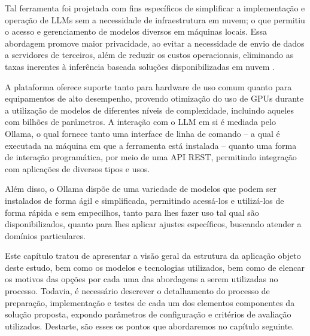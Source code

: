 Tal ferramenta foi projetada com fins específicos de simplificar a implementação e operação de \ac{LLM}s sem a necessidade de infraestrutura em nuvem; o que permitiu o acesso e gerenciamento de modelos diversos em máquinas locais. Essa abordagem promove maior privacidade, ao evitar a necessidade de envio de dados a servidores de terceiros, além de reduzir os custos operacionais, eliminando as taxas inerentes à inferência baseada soluções disponibilizadas em nuvem \cite{Ollama:1}.

A plataforma oferece suporte tanto para hardware de uso comum quanto para equipamentos de alto desempenho, provendo otimização do uso de GPUs durante a utilização de modelos de diferentes níveis de complexidade, incluindo aqueles com bilhões de parâmetros. A interação com o \ac{LLM} em si é mediada pelo Ollama, o qual fornece tanto uma interface de linha de comando -- a qual é executada na máquina em que a ferramenta está instalada -- quanto uma forma de interação programática, por meio de uma API REST, permitindo integração com aplicações de diversos tipos e usos.

Além disso, o Ollama dispõe de uma variedade de modelos que podem ser instalados de forma ágil e simplificada, permitindo acessá-los e utilizá-los de forma rápida e sem empecilhos, tanto para lhes fazer uso tal qual são disponibilizados, quanto para lhes aplicar ajustes específicos, buscando atender a domínios particulares.

Este capítulo tratou de apresentar a visão geral da estrutura da aplicação objeto deste estudo, bem como os modelos e tecnologias utilizados, bem como de elencar os motivos das opções por cada uma das abordagens a serem utilizadas no processo. Todavia, é necessário descrever o detalhamento do processo de preparação, implementação e testes de cada um dos elementos componentes da solução proposta, expondo parâmetros de configuração e critérios de avaliação utilizados. Destarte, são esses os pontos que abordaremos no capítulo seguinte.